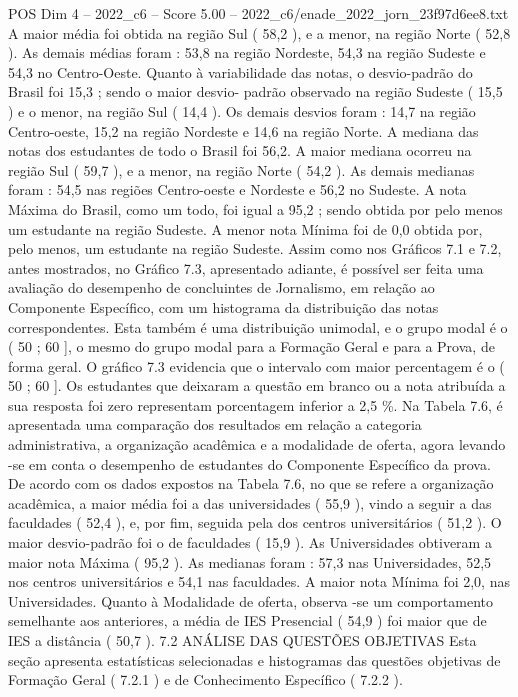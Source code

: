 \begin{textsample}{POS Dim 4 – 2022\_c6 – Score 5.00 – 2022\_c6/enade\_2022\_jorn\_23f97d6ee8.txt}
A maior média foi obtida na região Sul ( 58,2 ), e a menor, na região Norte ( 52,8 ).
As demais médias foram : 53,8 na região Nordeste, 54,3 na região Sudeste e 54,3 no Centro-Oeste.
Quanto à variabilidade das notas, o desvio-padrão do Brasil foi 15,3 ; sendo o maior desvio- padrão observado na região Sudeste ( 15,5 ) e o menor, na região Sul ( 14,4 ).
Os demais desvios foram : 14,7 na região Centro-oeste, 15,2 na região Nordeste e 14,6 na região Norte.
A mediana das notas dos estudantes de todo o Brasil foi 56,2.
A maior mediana ocorreu na região Sul ( 59,7 ), e a menor, na região Norte ( 54,2 ).
As demais medianas foram : 54,5 nas regiões Centro-oeste e Nordeste e 56,2 no Sudeste.
A nota Máxima do Brasil, como um todo, foi igual a 95,2 ; sendo obtida por pelo menos um estudante na região Sudeste.
A menor nota Mínima foi de 0,0 obtida por, pelo menos, um estudante na região Sudeste.
Assim como nos Gráficos 7.1 e 7.2, antes mostrados, no Gráfico 7.3, apresentado adiante, é possível ser feita uma avaliação do desempenho de concluintes de Jornalismo, em relação ao Componente Específico, com um histograma da distribuição das notas correspondentes.
Esta também é uma distribuição unimodal, e o grupo modal é o ( 50 ; 60 ], o mesmo do grupo modal para a Formação Geral e para a Prova, de forma geral.
O gráfico 7.3 evidencia que o intervalo com maior percentagem é o ( 50 ; 60 ].
Os estudantes que deixaram a questão em branco ou a nota atribuída a sua resposta foi zero representam porcentagem inferior a 2,5 \%.
Na Tabela 7.6, é apresentada uma comparação dos resultados em relação a categoria administrativa, a organização acadêmica e a modalidade de oferta, agora levando -se em conta o desempenho de estudantes do Componente Específico da prova.
De acordo com os dados expostos na Tabela 7.6, no que se refere a organização acadêmica, a maior média foi a das universidades ( 55,9 ), vindo a seguir a das faculdades ( 52,4 ), e, por fim, seguida pela dos centros universitários ( 51,2 ).
O maior desvio-padrão foi o de faculdades ( 15,9 ).
As Universidades obtiveram a maior nota Máxima ( 95,2 ).
As medianas foram : 57,3 nas Universidades, 52,5 nos centros universitários e 54,1 nas faculdades.
A maior nota Mínima foi 2,0, nas Universidades.
Quanto à Modalidade de oferta, observa -se um comportamento semelhante aos anteriores, a média de IES Presencial ( 54,9 ) foi maior que de IES a distância ( 50,7 ). 7.2 ANÁLISE DAS QUESTÕES OBJETIVAS Esta seção apresenta estatísticas selecionadas e histogramas das questões objetivas de Formação Geral ( 7.2.1 ) e de Conhecimento Específico ( 7.2.2 ).

\end{textsample}

